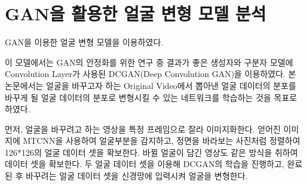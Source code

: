 \documentclass{oblivoir}
\begin{document}
\section{ GAN을 활용한 얼굴 변형 모델 분석}

GAN을 이용한 얼굴 변형 모델\cite{reference11}을 이용하였다.

이 모델에서는 GAN의 안정화를 위한 연구 중 결과가 좋은 생성자와 구분자 모델에 Convolution Layer가 사용된 DCGAN(Deep Convolution GAN)을 이용하였다. 본 논문에서는 얼굴을 바꾸고자 하는 Original Video에서 뽑아낸 얼굴 데이터의 분포를 바꾸게 될 얼굴 데이터의 분포로 변형시킬 수 있는 네트워크를 학습하는 것을 목표로 하였다.

먼저, 얼굴을 바꾸려고 하는 영상을 특정 프레임으로 잘라 이미지화한다. 얻어진 이미지에 MTCNN을 사용하여 얼굴부분을 감지하고,  정면을 바라보는 사진처럼 정렬하여 126*126의 얼굴 데이터 셋을 확보한다. 바뀔 얼굴이 담긴 영상도 같은 방식을 취하여 데이터 셋을 확보한다. 두 얼굴 데이터 셋을 이용해 DCGAN의 학습을 진행하고, 완료된 후 바꾸려는 얼굴 데이터 셋을 신경망에 입력시켜 얼굴을 변형한다.
\end{document}

